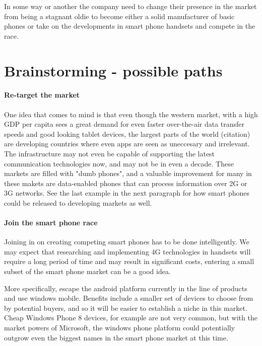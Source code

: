 \documentclass{article}
\begin{document}
In some way or another the company need to change their presence in the market from being a stagnant oldie to become either a solid manufacturer of basic phones or take on the developments in smart phone handsets and compete in the race.

\section{Brainstorming - possible paths} %
\label{sec:Brainstorming - possible paths}
\paragraph{Re-target the market} %
\label{par:Re-target the market}
One idea that comes to mind is that even though the western market, with a high GDP per capita sees a great demand for even faster over-the-air data transfer speeds and good looking tablet devices, the largest parts of the world (citation) are developing countries where even apps are seen as uneccesary and irrelevant. The infrastructure may not even be capable of supporting the latest communication technologies now, and may not be in even a decade.
These markets are filled with "dumb phones", and a valuable improvement for many in these makets are data-enabled phones that can process information over 2G or 3G networks. See the last example in the next paragraph for how smart phones could be released to developing markets as well.

\paragraph{Join the smart phone race} %
\label{par:Join the smart phone race}
Joining in on creating competing smart phones has to be done intelligently. We may expect that researching and implementing 4G technologies in handsets will require a long period of time and may result in significant costs, entering a small subset of the smart phone market can be a good idea.

More specifically, escape the android platform currently in the line of products and use windows mobile. Benefits include a smaller set of devices to choose from by potential buyers, and so it will be easier to establish a niche in this market. Cheap Windows Phone 8 devices, for example are not very common, but with the market powers of Microsoft, the windows phone platform could potentially outgrow even the biggest names in the smart phone market at this time.
\end{document}
